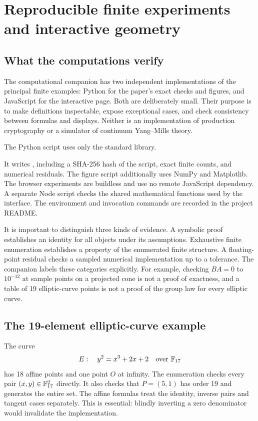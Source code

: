 \chapter{Reproducible finite experiments and interactive geometry}

\section{What the computations verify}

The computational companion has two independent implementations of the
principal finite examples: Python for the paper's exact checks and figures,
and JavaScript for the interactive page. Both are deliberately small. Their
purpose is to make definitions inspectable, expose exceptional cases, and
check consistency between formulas and displays. Neither is an implementation
of production cryptography or a simulator of continuum Yang--Mills theory.

The Python script  uses only the standard
library.

It writes , including a SHA-256
hash of the script, exact finite counts, and numerical residuals. The figure
script additionally uses NumPy and Matplotlib. The browser experiments are
buildless and use no remote JavaScript dependency. A separate Node script
 checks the shared mathematical functions used
by the interface. The environment and invocation commands are recorded in
the project README.

It is important to distinguish three kinds of evidence. A symbolic proof
establishes an identity for all objects under its assumptions. Exhaustive
finite enumeration establishes a property of the enumerated finite
structure. A floating-point residual checks a sampled numerical
implementation up to a tolerance. The companion labels these categories
explicitly. For example, checking $BA=0$ to $10^{-12}$ at sample points on a
projected cone is not a proof of exactness, and a table of 19 elliptic-curve
points is not a proof of the group law for every elliptic curve.

\section{The 19-element elliptic-curve example}

The curve
\[
 E:\quad y^2=x^3+2x+2\quad\text{over }\mathbb{F}_{17}
\]
has 18 affine points and one point $O$ at infinity. The enumeration checks
every pair $(x,y)\in\mathbb{F}_{17}^2$ directly. It also checks that
$P=(5,1)$ has order 19 and generates the entire set. The affine formulas
treat the identity, inverse pairs and tangent cases separately. This is
essential: blindly inverting a zero denominator would invalidate the
implementation.

